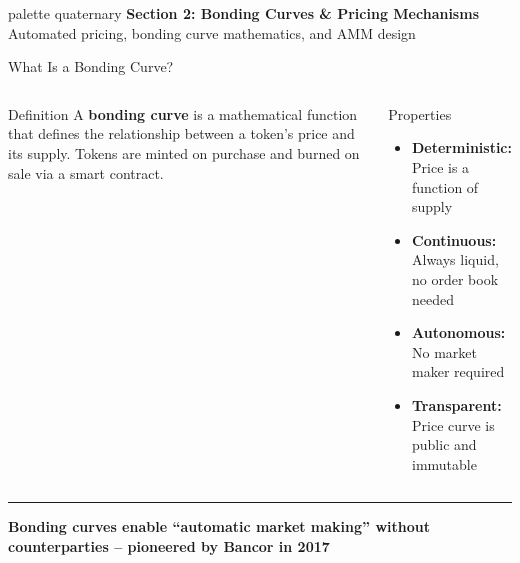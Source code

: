 \documentclass[8pt,aspectratio=169]{beamer}
\newcommand{\bottomnote}[1]{\vfill\vspace{-2mm}\textcolor{mllavender2}{\rule{\textwidth}{0.4pt}}\vspace{1mm}\footnotesize\textbf{#1}}
\begin{document}
\begin{frame}{}
\begin{beamercolorbox}[sep=12pt,center,rounded=true,shadow=true]{palette quaternary}
{\Large\bfseries Section 2: Bonding Curves \& Pricing Mechanisms}\\[6pt]
{\normalsize Automated pricing, bonding curve mathematics, and AMM design}
\end{beamercolorbox}
\end{frame}

\begin{frame}{What Is a Bonding Curve?}
\begin{columns}[T]
\begin{block}{Definition}
\footnotesize
A \textbf{bonding curve} is a mathematical function that defines the relationship between a token's price and its supply. Tokens are minted on purchase and burned on sale via a smart contract.
\end{block}
\vspace{2mm}
\begin{block}{Properties}
\footnotesize
\begin{itemize}
  \item \textbf{Deterministic:} Price is a function of supply
  \item \textbf{Continuous:} Always liquid, no order book needed
  \item \textbf{Autonomous:} No market maker required
  \item \textbf{Transparent:} Price curve is public and immutable
\end{itemize}
\end{block}

\end{columns}
\bottomnote{Bonding curves enable ``automatic market making'' without counterparties -- pioneered by Bancor in 2017}
\end{frame}
\end{document}
